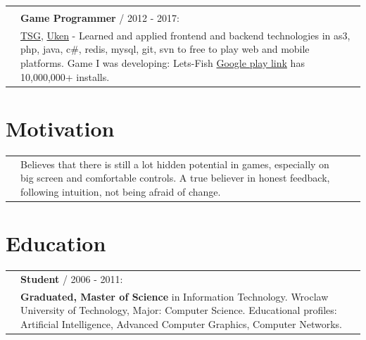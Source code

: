 \documentclass[12pt,a4paper]{article}
\begin{document}
\begin{multicols}{2}
\begin{tabular}{ >{\RaggedLeft}p{0cm}   p{9cm}  }
		& \\
		&  \textbf{Game Programmer} / 2012 - 2017: \\ 
		& \hspace{5mm} {\href{https://tensquaregames.com/}{TSG}}, {\href{https://www.uken.com/}{Uken}} - Learned and applied frontend and backend technologies in as3, php, java, c\#, redis, mysql, git, svn to free to play web and mobile platforms. Game I was developing: Lets-Fish {\href{https://play.google.com/store/apps/details?id=air.com.tensquaregames.letsfish}{Google play link}} has 10,000,000+ installs.    \\	 

	\end{tabular}

\vfill

\section*{ Motivation}

\begin{tabular}  { >{\RaggedLeft}p{0cm}  p{9cm}  p{0cm} }  
	 & Believes that there is still a lot hidden potential in games, especially on big screen and comfortable controls. A true believer in honest feedback, following intuition, not being afraid of change. & \\
\end{tabular}


\section*{Education }
	\begin{tabular}{ >{\RaggedLeft}p{0cm}  p{8.5cm}   }

		 & \textbf{Student} / 2006 - 2011: \\
		& \hspace{5mm}  \textbf{Graduated, Master of Science} in Information Technology. Wroclaw University of Technology, Major: Computer Science. Educational profiles: Artificial Intelligence, Advanced Computer Graphics, Computer Networks.   \\	 
	\end{tabular}



\end{multicols}
\end{document}
